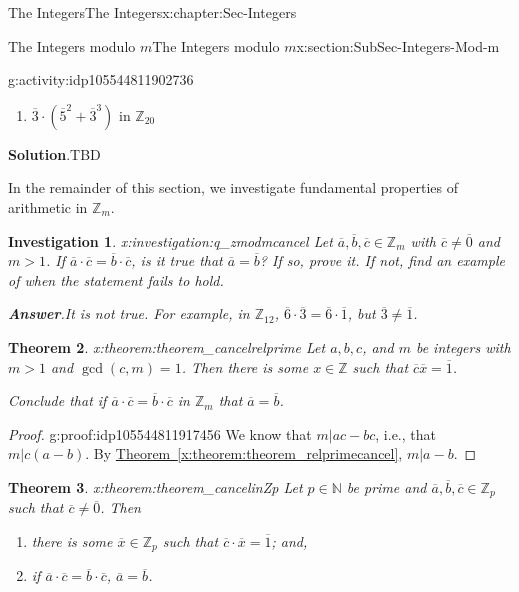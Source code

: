 \documentclass[oneside,10pt,]{book}
\newcommand{\blocktitlefont}{\relax}
\newcommand{\xreffont}{\relax}
\numberwithin{equation}{section}
\def\Z{{\mathbb Z}}
\def\N{{\mathbb N}}
\newtheorem{theorem}{Theorem}[section]
\newtheorem{investigation}[theorem]{Investigation}
\begin{document}
\begin{chapterptx}{The Integers}{}{The Integers}{}{}{x:chapter:Sec-Integers}
\begin{sectionptx}{The Integers modulo \(m\)}{}{The Integers modulo \(m\)}{}{}{x:section:SubSec-Integers-Mod-m}
\begin{activity}{}{g:activity:idp105544811902736}
\begin{enumerate}
\item{}\(\overline{3}\cdot(\overline{5}^2+\overline{3}^3)\) in \(\Z_{20}\)%
\end{enumerate}
\par\smallskip%
\noindent\textbf{\blocktitlefont Solution}.\hypertarget{g:solution:idp105544811907856}{}\quad{}TBD\end{activity}%
In the remainder of this section, we investigate fundamental properties of arithmetic in \(\Z_m\).%
\begin{investigation}{}{x:investigation:q_zmodmcancel}%
Let \(\overline{a},\overline{b},\overline{c}\in \Z_m\) with \(\overline{c}\ne\overline{0}\) and \(m > 1\). If \(\overline{a}\cdot \overline{c} = \overline{b}\cdot \overline{c}\), is it true that \(\overline{a} = \overline{b}\)? If so, prove it. If not, find an example of when the statement fails to hold.%
\par\smallskip%
\noindent\textbf{\blocktitlefont Answer}.\hypertarget{g:answer:idp105544811911568}{}\quad{}It is not true. For example, in \(\Z_{12}\), \(\overline{6}\cdot \overline{3} = \overline{6}\cdot\overline{1}\), but \(\overline{3}\ne \overline{1}\).%
\end{investigation}%
\begin{theorem}{}{}{x:theorem:theorem_cancelrelprime}%
Let \(a,b,c\), and \(m\) be integers with \(m > 1\) and \(\gcd(c,m)=1\). Then there is some \(x\in \Z\) such that \(\overline{c} \overline{x} = \overline{1}\).%
\par
Conclude that if \(\overline{a} \cdot\overline{c} = \overline{b}\cdot\overline{c}\) in \(\Z_m\) that \(\overline{a} = \overline{b}\).%
\end{theorem}
\begin{proof}{}{g:proof:idp105544811917456}
We know that \(m|ac-bc\), i.e., that \(m|c(a-b)\). By \hyperref[x:theorem:theorem_relprimecancel]{Theorem~{\xreffont\ref{x:theorem:theorem_relprimecancel}}}, \(m|a-b\).%
\end{proof}
\begin{theorem}{}{}{x:theorem:theorem_cancelinZp}%
Let \(p\in \N\) be prime and \(\overline{a},\overline{b},\overline{c}\in \Z_p\) such that \(\overline{c}\ne \overline{0}\). Then%
\begin{enumerate}
\item{}there is some \(\overline{x}\in \Z_p\) such that \(\overline{c}\cdot \overline{x} = \overline{1}\); and,%
\item{}if \(\overline{a} \cdot\overline{c} = \overline{b}\cdot\overline{c}\), \(\overline{a} = \overline{b}\).%

\end{enumerate}
\end{theorem}
\end{sectionptx}
\end{chapterptx}
\end{document}
